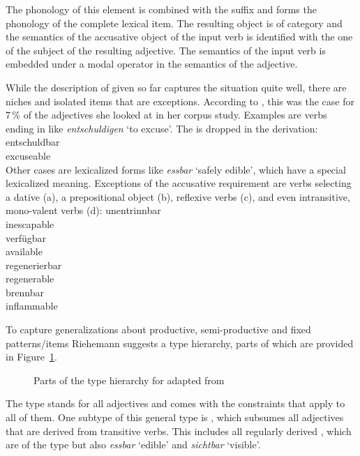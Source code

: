 \documentclass[output=paper]{langsci/langscibook}
\begin{document}
The phonology of this element  is combined with the suffix  and forms the
phonology of the complete lexical item. The resulting object is of category  and the
semantics of the accusative object of the input verb  is identified with the one of the subject of the resulting adjective. The semantics of the
input verb  is embedded under a modal operator in the semantics of the adjective. 

While the description of \bard given so far captures
the situation quite well, there are niches and isolated items that are exceptions. According to
\citet[]{Riehemann98a}, this was the case for 7\,\% of the adjectives she looked at in her
corpus study. Examples are verbs ending in  like \emph{entschuldigen} `to excuse'. The
 is dropped in the derivation:
\ea
\gll entschuldbar\\
     excuseable\\
\z
Other cases are lexicalized forms like \emph{essbar} `safely edible', which have a special
lexicalized meaning. Exceptions of the accusative requirement are verbs selecting a dative
(a), a prepositional object (b), reflexive verbs (c), and even intransitive, mono-valent verbs (d):
\eal
\ex 
\gll unentrinnbar\\
     inescapable\\
\ex 
\gll verfügbar\\
     available\\
\ex
\gll regenerierbar\\
     regenerable\\
\ex 
\gll brennbar\\
     inflammable\\
\zl 

To capture generalizations about productive, semi-productive and fixed patterns/items Riehemann
suggests a type hierarchy, parts of which are provided in
Figure~\ref{fig-bar-Riehemann}.
\begin{figure}
\centerfit{%
\begin{forest}
typehierarchy
[bar-adj
  [trans-bar-adj
    [reg-bar-adj]
    [essbar]
    [\ldots]]
  [dative-bar-adj
    [unentrinnbar]
    [\ldots]]
  [prep-bar-adj
    [verfügbar]]
  [intr-bar-adj
    [brennbar]
    [\ldots]]]
\end{forest}}
\caption{\label{fig-bar-Riehemann}Parts of the type hierarchy for \bard adapted from }
\end{figure}
The type  stands for all  adjectives and comes with the constraints that
apply to all of them. One subtype of this general type is , which subsumes all
adjectives that are derived from transitive verbs. This includes all regularly derived \baradjs,
which are of the type  but also \emph{essbar} `edible' and \emph{sichtbar} `visible'.
\end{document}
